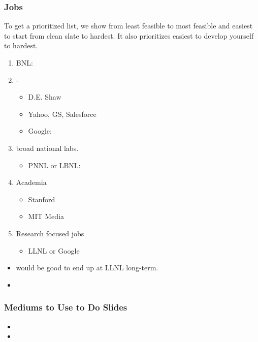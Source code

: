 \begin{frame}
\frametitle{Jobs}
{\small To get a prioritized list, we show from least feasible to most
  feasible and easiest to start from clean slate to hardest. It also
  prioritizes easiest to develop yourself to hardest. } 
\begin{enumerate} 
\small \item \small BNL: 
\item \small - 
\begin{itemize} 
\tiny \item \tiny D.E. Shaw 
\item \tiny Yahoo,  GS, Salesforce
\item \tiny  Google: 
\end{itemize}
 
\item \small broad national labs. 
\begin{itemize}
\tiny  \item \tiny PNNL or LBNL: 
\end{itemize} 

\item \small Academia 
\begin{itemize} 
\tiny \item \tiny Stanford 
\item \tiny MIT Media 
\end{itemize} 
\item \small Research focused jobs
\begin{itemize} 
\tiny \item \tiny  LLNL or Google
\end{itemize} 
\end{enumerate} 

\begin{itemize}
\tiny \item \tiny would be good to end up at LLNL long-term. 
\item \tiny 
\end{itemize} 
\end{frame} 

\begin{frame} 
\frametitle{Mediums to Use to Do Slides}

\begin{itemize} 
\tiny \item \tiny  
\item \tiny 
\end{itemize} 
\end{frame}

